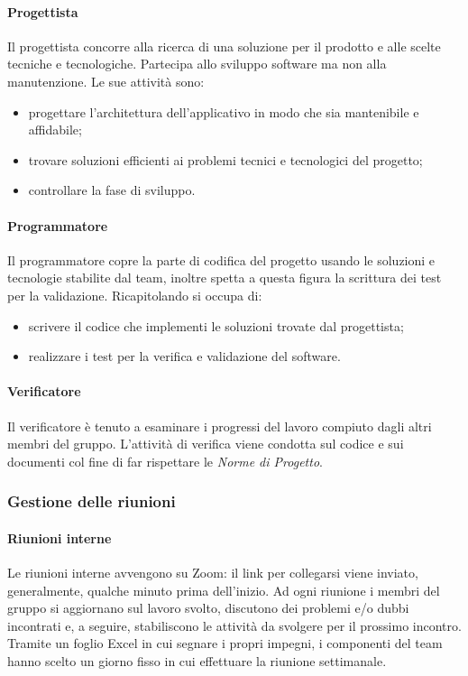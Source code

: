\paragraph{Progettista} \hfill \break
Il progettista concorre alla ricerca di una soluzione per il prodotto e alle scelte tecniche e tecnologiche.
Partecipa allo sviluppo software ma non alla manutenzione. Le sue attività sono:
\begin{itemize}
    \item progettare l'architettura dell'applicativo in modo che sia mantenibile e affidabile;
    \item trovare soluzioni efficienti ai problemi tecnici e tecnologici del progetto;
    \item controllare la fase di sviluppo.
\end{itemize}

\paragraph{Programmatore} \hfill \break
Il programmatore copre la parte di codifica del progetto usando le soluzioni e tecnologie stabilite dal team, inoltre
spetta a questa figura la scrittura dei test per la validazione. Ricapitolando si occupa di:
\begin{itemize}
    \item scrivere il codice che implementi le soluzioni trovate dal progettista;
    \item realizzare i test per la verifica e validazione del software.
\end{itemize}

\paragraph{Verificatore} \hfill \break
Il verificatore è tenuto a esaminare i progressi del lavoro compiuto dagli altri membri del gruppo.   
L'attività di verifica viene condotta sul codice e sui documenti col fine di far rispettare le \emph{Norme di Progetto}.

\subsubsection{Gestione delle riunioni}
\paragraph{Riunioni interne} \hfill \break
Le riunioni interne avvengono su Zoom: il link per collegarsi viene inviato, generalmente, 
qualche minuto prima dell'inizio. Ad ogni riunione i membri del gruppo si aggiornano sul lavoro svolto, discutono dei problemi e/o dubbi incontrati 
e, a seguire, stabiliscono le attività da svolgere per il prossimo incontro. Tramite un foglio Excel in cui segnare i propri impegni, 
i componenti del team hanno scelto un giorno fisso in cui effettuare la riunione settimanale.

